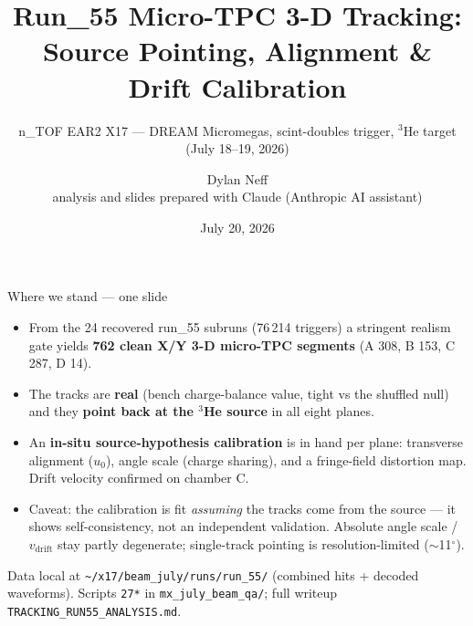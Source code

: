 \documentclass[aspectratio=169,10pt]{beamer}
\title{Run\_55 Micro-TPC 3-D Tracking:\\
       Source Pointing, Alignment \& Drift Calibration}
\subtitle{n\_TOF EAR2 X17 --- DREAM Micromegas, scint-doubles trigger,
          $^3$He target (July 18--19, 2026)}
\author{Dylan Neff \\[0.5ex] {\small analysis and slides prepared with Claude
        (Anthropic AI assistant)}}
\date{July 20, 2026}
\begin{document}
\begin{frame}\titlepage\end{frame}

\begin{frame}{Where we stand --- one slide}
\begin{itemize}
\item From the 24 recovered run\_55 subruns (76\,214 triggers) a stringent
      realism gate yields \textbf{762 clean X/Y 3-D micro-TPC segments}
      (A 308, B 153, C 287, D 14).
\item The tracks are \textbf{real} (bench charge-balance value, tight vs the
      shuffled null) and they \textbf{point back at the $^3$He source} in all
      eight planes.
\item An \textbf{in-situ source-hypothesis calibration} is in hand per plane:
      transverse alignment ($u_0$), angle scale (charge sharing), and a
      fringe-field distortion map. Drift velocity confirmed on chamber C.
\item \alert{Caveat:} the calibration is fit \emph{assuming} the tracks come
      from the source --- it shows self-consistency, not an independent
      validation. Absolute angle scale / $v_\mathrm{drift}$ stay partly
      degenerate; single-track pointing is resolution-limited ($\sim$11$^\circ$).
\end{itemize}
\vspace{0.5ex}
\footnotesize Data local at \texttt{\~{}/x17/beam\_july/runs/run\_55/}
(combined hits + decoded waveforms). Scripts \texttt{27*} in
\texttt{mx\_july\_beam\_qa/}; full writeup
\texttt{TRACKING\_RUN55\_ANALYSIS.md}.
\end{frame}
\end{document}
